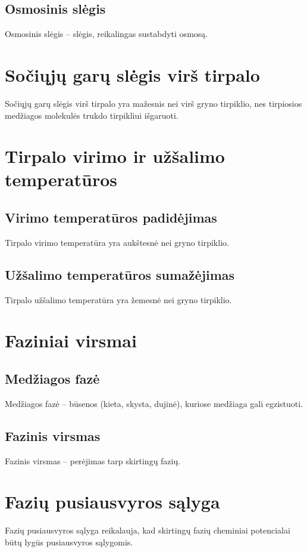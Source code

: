 \documentclass[a4paper,12pt]{article}
\begin{document}
\subsection{Osmosinis slėgis}
Osmosinis slėgis – slėgis, reikalingas sustabdyti osmosą.

\section{Sočiųjų garų slėgis virš tirpalo}
Sočiųjų garų slėgis virš tirpalo yra mažesnis nei virš gryno tirpiklio, nes tirpiosios medžiagos molekulės trukdo tirpikliui išgaruoti.

\section{Tirpalo virimo ir užšalimo temperatūros}

\subsection{Virimo temperatūros padidėjimas}
Tirpalo virimo temperatūra yra aukštesnė nei gryno tirpiklio.

\subsection{Užšalimo temperatūros sumažėjimas}
Tirpalo užšalimo temperatūra yra žemesnė nei gryno tirpiklio.

\section{Faziniai virsmai}

\subsection{Medžiagos fazė}
Medžiagos fazė – būsenos (kieta, skysta, dujinė), kuriose medžiaga gali egzistuoti.

\subsection{Fazinis virsmas}
Fazinis virsmas – perėjimas tarp skirtingų fazių.

\section{Fazių pusiausvyros sąlyga}
Fazių pusiausvyros sąlyga reikalauja, kad skirtingų fazių cheminiai potencialai būtų lygūs pusiausvyros sąlygomis.
\end{document}
